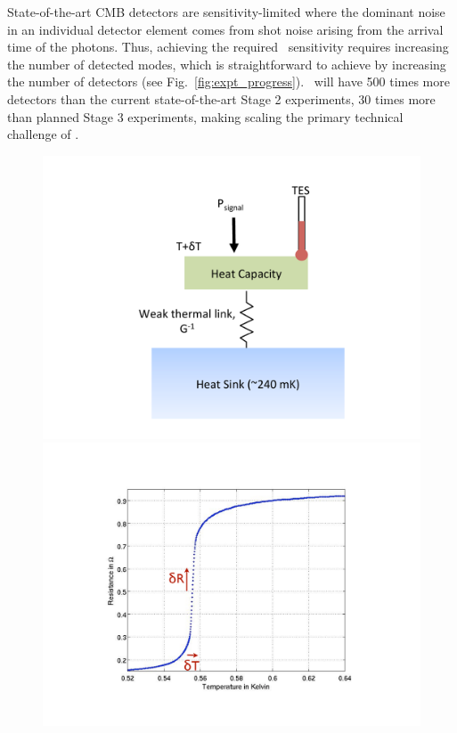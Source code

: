 State-of-the-art CMB detectors are sensitivity-limited where the dominant
noise in an individual detector element comes from shot noise arising
from the arrival time of the photons. Thus, achieving the required
\cmbexp\ sensitivity requires increasing the number of detected modes,
which is straightforward to achieve by increasing the number of
detectors (see Fig.~\ref{fig:expt_progress}). \cmbexp\ will have 500
times more detectors than the current state-of-the-art Stage 2
experiments, 30 times more than planned Stage 3 experiments, making
scaling the primary technical challenge of \cmbexp.

\begin{figure}[t]
\centering
\includegraphics[trim=0.7in 0 1.5in 0,clip,scale=0.3]{Instrumentation/ThermalCircuit.pdf}
\includegraphics[trim=0.4in 0.4in 0.1 0,clip,scale=0.23]{Instrumentation/RvsT.pdf}

\end{figure}

